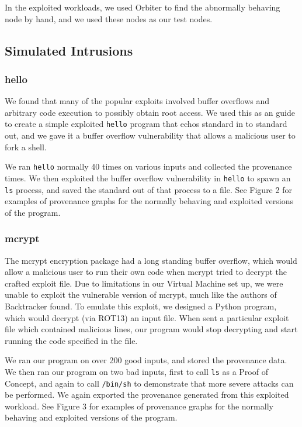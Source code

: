 \documentclass[10pt,twocolumn]{article}
\begin{document}
In the exploited workloads, we used Orbiter \cite{orbiter} to find the abnormally behaving node by hand, and we used these nodes as our test nodes.

\subsection{Simulated Intrusions}

\subsubsection{hello}
We found that many of the popular exploits \cite{metasploit, exploitdb} involved buffer overflows and arbitrary code execution to possibly obtain root access. We used this as an guide to create a simple exploited \texttt{hello} program that echos standard in to standard out, and we gave it a buffer overflow vulnerability that allows a malicious user to fork a shell.

We ran \texttt{hello} normally 40 times on various inputs and collected the provenance times. We then exploited the buffer overflow vulnerability in \texttt{hello} to spawn an \texttt{ls} process, and saved the standard out of that process to a file. See Figure 2 for examples of provenance graphs for the normally behaving and exploited versions of the program.

\subsubsection{mcrypt}
The mcrypt encryption package had a long standing buffer overflow, which would allow a malicious user to run their own code when mcrypt tried to decrypt the crafted exploit file. Due to limitations in our Virtual Machine set up, we were unable to exploit the vulnerable version of mcrypt, much like the authors of Backtracker \cite{backtracker} found. To emulate this exploit, we designed a Python program, which would decrypt (via ROT13) an input file. When sent a particular exploit file which contained malicious lines, our program would stop decrypting and start running the code specified in the file.

We ran our program on over 200 good inputs, and stored the provenance data. We then ran our program on two bad inputs, first to call \texttt{ls} as a Proof of Concept, and again to call \texttt{/bin/sh} to demonstrate that more severe attacks can be performed. We again exported the provenance generated from this exploited workload. See Figure 3 for examples of provenance graphs for the normally behaving and exploited versions of the program.
\end{document}
